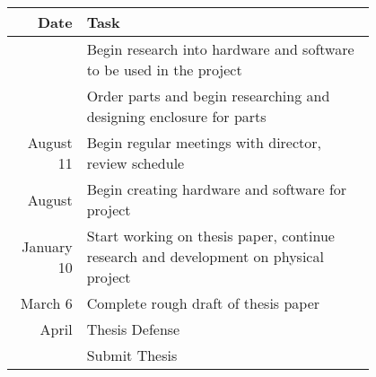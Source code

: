 \documentclass[11pt]{article}
\begin{document}
\begin{tabular}{r|p{0.8\linewidth}}
	Date       & Task                                                                                 \\
	\hline
	           & Begin research into hardware and software to be used in the project                  \\
	           & Order parts and begin researching and designing enclosure for parts                  \\
	August 11  & Begin regular meetings with director, review schedule                                \\
	August     & Begin creating hardware and software for project                                     \\
	January 10 & Start working on thesis paper, continue research and development on physical project \\
	March 6    & Complete rough draft of thesis paper                                                 \\
	April      & Thesis Defense                                                                       \\
	           & Submit Thesis                                                                        \\
\end{tabular}
\end{document}
